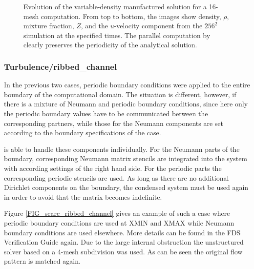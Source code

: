 \begin{figure}[ht]
\caption[Evolution of the variable-density manufactured solution for a 16-mesh \scarc{} computation]{Evolution of the variable-density manufactured solution for a 16-mesh \scarc{} computation.  From top to bottom, the images show density, $\rho$, mixture fraction, $Z$, and the $u$-velocity component from the $256^2$ simulation at the specified times. The parallel computation by \scarc{} clearly preserves the periodicity of the analytical solution.}
\label{FIG_scarc_shunn3}
\end{figure}




\subsubsection{Turbulence/ribbed\_channel}

In the previous two cases, periodic boundary conditions were applied to the entire boundary of the computational domain. The situation is different, however, if there is a mixture of Neumann and periodic boundary conditions, since here only the periodic boundary values have to be communicated between the corresponding partners, while those for the Neumann components are set according to the boundary specifications of the case.

\scarc{} is able to handle these components individually. For the Neumann parts of the boundary, corresponding Neumann matrix stencils are integrated into the system with according settings of the right hand side. For the periodic parts the corresponding periodic stencils are used.
As long as there are no additional Dirichlet components on the boundary, the condensed system must be used again
in order to avoid that the matrix becomes indefinite. 

Figure \ref{FIG_scarc_ribbed_channel} gives an example of such a case where periodic boundary conditions are used at
{\ct XMIN} and {\ct XMAX} while Neumann boundary conditions are used elsewhere.
More details can be found in the FDS Verification Guide \cite{McGrattan:2018:VG} again.
Due to the large internal obstruction the unstructured \uscarc{} solver based on a 4-mesh subdivision was used. As can be seen the original flow pattern is matched again. 

